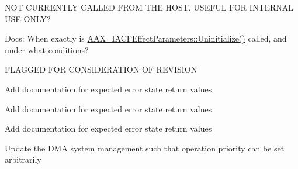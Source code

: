 \begin{DoxyRefList}
\label{todo__todo000042}%
%
N\+OT C\+U\+R\+R\+E\+N\+T\+LY C\+A\+L\+L\+ED F\+R\+OM T\+HE H\+O\+ST. U\+S\+E\+F\+UL F\+OR I\+N\+T\+E\+R\+N\+AL U\+SE O\+N\+LY? 
\item[Member \mbox{\hyperlink{class_a_a_x___i_a_c_f_effect_parameters_a711969adc95624fb9ac8a3e3b2c23696}{A\+A\+X\+\_\+\+I\+A\+C\+F\+Effect\+Parameters::Uninitialize}} ()=0]\label{todo__todo000037}%
%
Docs\+: When exactly is \mbox{\hyperlink{class_a_a_x___i_a_c_f_effect_parameters_a711969adc95624fb9ac8a3e3b2c23696}{A\+A\+X\+\_\+\+I\+A\+C\+F\+Effect\+Parameters\+::\+Uninitialize()}} called, and under what conditions? 
\item[Member \mbox{\hyperlink{class_a_a_x___i_a_c_f_effect_parameters_a685858711efb8634ce66c327f2865c71}{A\+A\+X\+\_\+\+I\+A\+C\+F\+Effect\+Parameters::Update\+Parameter\+Normalized\+Value}} (A\+A\+X\+\_\+\+C\+Param\+ID i\+Parameter\+ID, double i\+Value, A\+A\+X\+\_\+\+E\+Update\+Source i\+Source)=0]\label{todo__todo000043}%
%
F\+L\+A\+G\+G\+ED F\+OR C\+O\+N\+S\+I\+D\+E\+R\+A\+T\+I\+ON OF R\+E\+V\+I\+S\+I\+ON 
\item[Class \mbox{\hyperlink{class_a_a_x___i_a_c_f_effect_parameters___v2}{A\+A\+X\+\_\+\+I\+A\+C\+F\+Effect\+Parameters\+\_\+\+V2}} ]\label{todo__todo000034}%
%
Add documentation for expected error state return values 
\item[Class \mbox{\hyperlink{class_a_a_x___i_a_c_f_effect_parameters___v3}{A\+A\+X\+\_\+\+I\+A\+C\+F\+Effect\+Parameters\+\_\+\+V3}} ]\label{todo__todo000035}%
%
Add documentation for expected error state return values 
\item[Class \mbox{\hyperlink{class_a_a_x___i_a_c_f_effect_parameters___v4}{A\+A\+X\+\_\+\+I\+A\+C\+F\+Effect\+Parameters\+\_\+\+V4}} ]\label{todo__todo000036}%
%
Add documentation for expected error state return values 
\item[Member \mbox{\hyperlink{class_a_a_x___i_component_descriptor_aff9e1c726bbdf500f2d61b164589744e}{A\+A\+X\+\_\+\+I\+Component\+Descriptor::Add\+Dma\+Instance}} (A\+A\+X\+\_\+\+C\+Field\+Index in\+Field\+Index, \mbox{\hyperlink{class_a_a_x___i_dma_af8d0f19f2896dd6dbd126b919b24e39b}{A\+A\+X\+\_\+\+I\+Dma\+::\+E\+Mode}} in\+Dma\+Mode)=0]\label{todo__todo000044}%
%
Update the D\+MA system management such that operation priority can be set arbitrarily 
\item[Member \mbox{\hyperlink{class_a_a_x___i_component_descriptor_a0e8f6217d0f317c728b3e30f15f181d2}{A\+A\+X\+\_\+\+I\+Component\+Descriptor::Add\+Process\+Proc}} (\mbox{\hyperlink{class_a_a_x___i_property_map}{A\+A\+X\+\_\+\+I\+Property\+Map}} $\ast$in\+Properties, A\+A\+X\+\_\+\+C\+Selector $\ast$out\+Proc\+I\+Ds=N\+U\+LL, int32\+\_\+t in\+Proc\+I\+Ds\+Size=0)=0]\label{todo__todo000047}%

\end{DoxyRefList}
